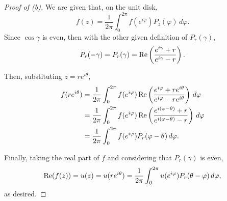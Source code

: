 \documentclass[../hw2]{subfiles}
\begin{document}
\begin{proof}[Proof of (b)]
	We are given that, on the unit disk, \[
		f(z)=\frac{1}{2\pi}\int_{0}^{2\pi} f(e^{i\varphi}) P_z(\varphi) \,d\varphi
		.\]
	Since $\cos{\gamma}$ is even, then with the other given definition of $P_{r}(\gamma)$,  \[
		P_{r}(-\gamma)=P_{r}(\gamma)= \operatorname{Re} \left( \frac{ e^{i\gamma} + r }{e^{i\gamma} - r} \right)
		.\]

	Then, substituting $z=re^{i\theta}$,
	\begin{align*}
		f(re^{i\theta}) & = \frac{1}{2\pi}\int_{0}^{2\pi} f(e^{i\varphi}) \operatorname{Re} \left( \frac{e^{i\varphi} + re^{i\theta}}{e^{i\varphi} - re^{i\theta}} \right) \,d\varphi \\
		                & = \frac{1}{2\pi}\int_{0}^{2\pi} f(e^{i\varphi}) \operatorname{Re} \left( \frac{e^{i(\varphi-\theta)} + r}{e^{i(\varphi-\theta)}-r} \right) \,d\varphi       \\
		                & =  \frac{1}{2\pi}\int_{0}^{2\pi} f(e^{i\varphi}) P_r(\varphi-\theta) \,d\varphi
		.\end{align*}

	Finally, taking the real part of $f$ and considering that $P_r(\gamma)$ is even, \[
		\operatorname{Re}(f(z))=u(z)=u(re^{i\theta})=\frac{1}{2\pi}\int_{0}^{2\pi} u(e^{i\varphi}) P_r(\theta-\varphi)\,d \varphi
		,\] as desired.
\end{proof}
\end{document}
